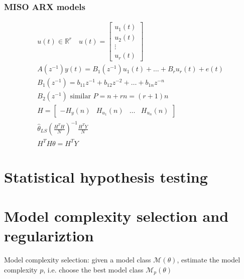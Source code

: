 \documentclass{book}
\begin{document}
\subsection{MISO ARX models}
\begin{gather*}
    u(t) \in \mathbb{R}^r \quad u(t) = \begin{bmatrix}
        u_1(t) \\ u_2(t) \\ \vdots \\ u_r(t)
    \end{bmatrix}\\
    A(z^{-1})y(t) = B_1(z^{-1}) u_1(t) + \dots + B_r u_r(t) + e(t)\\
    B_1(z^{-1}) = b_{11}z^{-1} + b_{12}z^{-2} + \dots + b_{1n}z^{-n}\\
    B_2(z^{-1}) \text{ similar }
    P=n+rn=(r+1)n\\
    H=\begin{bmatrix}
        -H_y(n) & H_{u_1}(n) & \dots & H_{u_n}(n)
    \end{bmatrix}\\
    \hat{\theta}_{LS} \left( \displaystyle\frac{H^TH}{N} \right)^{-1}\displaystyle\frac{H^TY}{N}\\
    H^TH \theta = H^TY
\end{gather*}



































\chapter{Statistical hypothesis testing}

\chapter{Model complexity selection and regulariztion}

Model complexity selection: given a model class $\mathcal{M}(\theta)$, estimate the model complexity $p$, i.e. choose the best model class $\mathcal{M}_p(\theta)$
\end{document}

